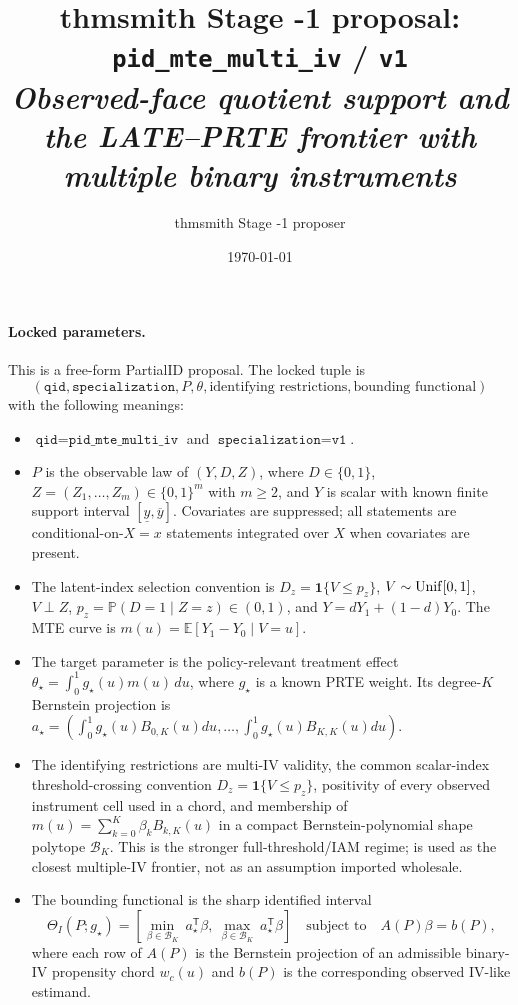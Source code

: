\documentclass[11pt]{article}
\title{thmsmith Stage -1 proposal: \texttt{pid\_mte\_multi\_iv} / \texttt{v1}%
  \\ \large\textit{Observed-face quotient support and the LATE--PRTE frontier with multiple binary instruments}}
\author{thmsmith Stage -1 proposer}
\date{\today}
\newcommand{\E}{\mathbb{E}}
\renewcommand{\Pr}{\mathbb{P}}
\newcommand{\one}{\mathbf{1}}
\newcommand{\transpose}{\mathsf{T}}
\theoremstyle{definition}
\theoremstyle{plain}
\theoremstyle{remark}
\begin{document}
\maketitle


\paragraph{Locked parameters.}
This is a free-form PartialID proposal. The locked tuple is
\[
(\texttt{qid},\texttt{specialization},P,\theta,\text{identifying restrictions},\text{bounding functional})
\]
with the following meanings:
\begin{itemize}[leftmargin=*]
\item \(\texttt{qid}=\texttt{pid\_mte\_multi\_iv}\) and \(\texttt{specialization}=\texttt{v1}\).
\item \(P\) is the observable law of \((Y,D,Z)\), where \(D\in\{0,1\}\), \(Z=(Z_1,\ldots,Z_m)\in\{0,1\}^m\) with \(m\geq 2\), and \(Y\) is scalar with known finite support interval \([\underline y,\overline y]\). Covariates are suppressed; all statements are conditional-on-\(X=x\) statements integrated over \(X\) when covariates are present.
\item The latent-index selection convention is \(D_z=\one\{V\leq p_z\}\), \(V\sim {\rm Unif}[0,1]\), \(V\perp Z\), \(p_z=\Pr(D=1\mid Z=z)\in(0,1)\), and \(Y=dY_1+(1-d)Y_0\). The MTE curve is \(m(u)=\E[Y_1-Y_0\mid V=u]\).
\item The target parameter is the policy-relevant treatment effect \(\theta_\star=\int_0^1 g_\star(u)m(u)\,du\), where \(g_\star\) is a known PRTE weight. Its degree-\(K\) Bernstein projection is \(a_\star=(\int_0^1 g_\star(u)B_{0,K}(u)du,\ldots,\int_0^1 g_\star(u)B_{K,K}(u)du)\).
\item The identifying restrictions are multi-IV validity, the common scalar-index threshold-crossing convention \(D_z=\one\{V\le p_z\}\), positivity of every observed instrument cell used in a chord, and membership of \(m(u)=\sum_{k=0}^K\beta_kB_{k,K}(u)\) in a compact Bernstein-polynomial shape polytope \(\mathcal B_K\). This is the stronger full-threshold/IAM regime; \citet{MogstadTorgovitskyWalters2024} is used as the closest multiple-IV frontier, not as an assumption imported wholesale.
\item The bounding functional is the sharp identified interval
\[
\Theta_I(P;g_\star)=
\left[
\min_{\beta\in\mathcal B_K}\ a_\star^\transpose\beta,\ 
\max_{\beta\in\mathcal B_K}\ a_\star^\transpose\beta
\right]
\quad\text{subject to}\quad A(P)\beta=b(P),
\]
where each row of \(A(P)\) is the Bernstein projection of an admissible binary-IV propensity chord \(w_c(u)\) and \(b(P)\) is the corresponding observed IV-like estimand.
\end{itemize}
\end{document}
